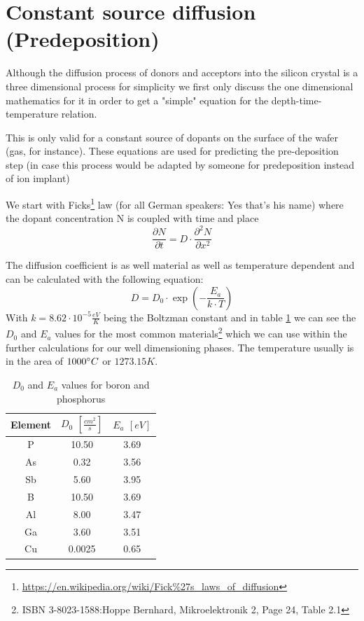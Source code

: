 \section{Constant source diffusion (Predeposition)}

Although the diffusion process of donors and acceptors into the silicon crystal is a three dimensional process for simplicity we first only discuss the one dimensional mathematics for it in order to get a "simple" equation for the depth-time-temperature relation.

\begin{mdframed}[linewidth=2pt,linecolor=red]
This is only valid for a constant source of dopants on the surface of the wafer (gas, for instance).
These equations are used for predicting the pre-deposition step (in case this process would be adapted by someone for predeposition instead of ion implant)
\end{mdframed}

We start with Ficks\footnote{\url{https://en.wikipedia.org/wiki/Fick\%27s_laws_of_diffusion}} law (for all German speakers: Yes that's his name) where the dopant concentration N is coupled with time and place
\begin{equation}
\frac{\partial N}{\partial t} = D \cdot \frac{\partial^2 N}{\partial x^2}
\end{equation}

The diffusion coefficient is as well material as well as temperature dependent  and can be calculated with the following equation:
\begin{equation}
D = D_0 \cdot \exp\left(-\frac{E_a}{k \cdot T}\right)
\end{equation}
With $k=8.62 \cdot 10^{-5} \frac{eV}{K}$ being the Boltzman constant and in table \ref{table:absolute_diffusion_coefficients} we can see the $D_0$ and $E_a$ values for the most common materials\footnote{ISBN 3-8023-1588:Hoppe Bernhard, Mikroelektronik 2, Page 24, Table 2.1} which we can use within the further calculations for our well dimensioning phases. The temperature usually is in the area of $1000\degree C$ or $1273.15 K$.
\begin{table}[H]
	\label{table:absolute_diffusion_coefficients}
	\centering
	\begin{tabular}{|c|c|c|}
		\hline
		Element &
		$D_0$ $\left[\frac{cm^2}{s}\right]$ &
		$E_a$ $\left[eV\right]$ \\
		\hline
		P &
		10.50 &
		3.69 \\
		\hline
		As &
		0.32 &
		3.56 \\
		\hline
		Sb &
		5.60 &
		3.95 \\
		\hline
		B &
		10.50 &
		3.69 \\
		\hline
		Al &
		8.00 &
		3.47 \\
		\hline
		Ga &
		3.60 &
		3.51 \\
		\hline
		Cu &
		0.0025 &
		0.65 \\
		\hline
	\end{tabular}
	\caption{$D_0$ and $E_a$ values for boron and phosphorus}
\end{table}

